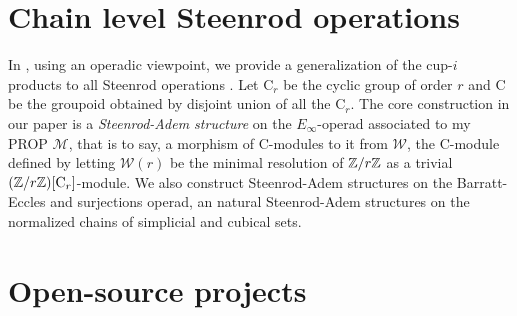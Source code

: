 \section{Chain level Steenrod operations}
In \cite{medina2020maysteenrod}, using an operadic viewpoint, we provide a generalization of the cup-$i$ products to all Steenrod operations \cite{steenrod1962cohomology}. Let $\mathrm C_r$ be the cyclic group of order $r$ and $\mathrm C$ be the groupoid obtained by disjoint union of all the $\mathrm C_r$. The core construction in our paper is a \textit{Steenrod-Adem structure} on the $E_\infty$-operad associated to my PROP $\mathcal M$, that is to say, a morphism of $\mathrm C$-modules to it from $\mathcal W$, the $\mathrm C$-module defined by letting $\mathcal W(r)$ be the minimal resolution of $\mathbb{Z}/r\mathbb{Z}$ as a trivial $(\mathbb{Z}/r\mathbb{Z})[\mathrm C_r]$-module. We also construct Steenrod-Adem structures on the Barratt-Eccles and surjections operad, an natural Steenrod-Adem structures on the normalized chains of simplicial and cubical sets.



\section{Open-source projects}

